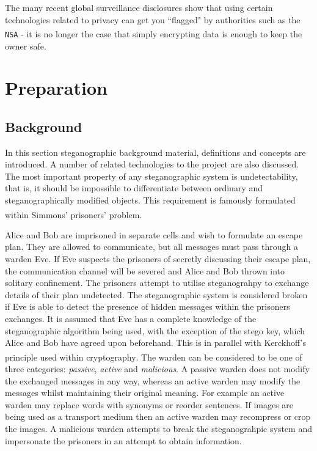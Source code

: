 \documentclass[paper=a4, fontsize=11pt,twoside]{scrartcl}
\numberwithin{table}{section}
\numberwithin{figure}{section}
\numberwithin{algorithm}{section}
\begin{document}
The many recent global surveillance disclosures show that using certain technologies related to privacy can get you ``flagged" by authorities such as the \texttt{NSA}\textsuperscript{\cite{nsa}} - it is no longer the case that simply encrypting data is enough to keep the owner safe.

\section{Preparation}
\subsection{Background}
In this section steganographic background material, definitions and concepts are introduced. A number of related technologies to the project are also discussed.\\

\noindent
The most important property of any steganographic system is undetectability, that is, it should be impossible to differentiate between ordinary and steganographically modified objects. This requirement is famously formulated within Simmons' prisoners' problem\textsuperscript{\cite{prisoner}}. 

Alice and Bob are imprisoned in separate cells and wish to formulate an escape plan. They are allowed to communicate, but all messages must pass through a warden Eve. If Eve suspects the prisoners of secretly discussing their escape plan, the communication channel will be severed and Alice and Bob thrown into solitary confinement. The prisoners attempt to utilise steganograhpy to exchange details of their plan undetected. The steganographic system is considered broken if Eve is able to detect the presence of hidden messages within the prisoners exchanges. It is assumed that Eve has a complete knowledge of the steganographic algorithm being used, with the exception of the stego key, which Alice and Bob have agreed upon beforehand. This is in parallel with Kerckhoff's principle used within cryptography\textsuperscript{\cite{kirc}}. The warden can be considered to be one of three categories: \textit{passive}, \textit{active} and \textit{malicious}. A passive warden does not modify the exchanged messages in any way, whereas an active warden may modify the messages whilst maintaining their original meaning. For example an active warden may replace words with synonyms or reorder sentences. If images are being used as a transport medium then an active warden may recompress or crop the images. A malicious warden attempts to break the steganograhpic system and impersonate the prisoners in an attempt to obtain information.
\end{document}
